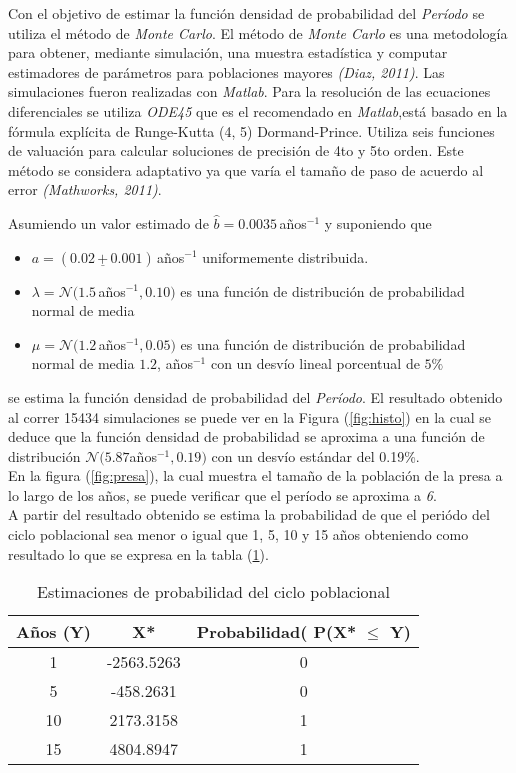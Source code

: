 \documentclass{SPANISH_acm_proc_article-sp}
\begin{document}
Con el objetivo de estimar la funci\'on densidad de probabilidad del \emph{Per\'iodo}
se utiliza el m\'etodo de \textit{Monte Carlo}. El m\'etodo de \textit{Monte Carlo} es una metodolog\'ia
para obtener, mediante simulaci\'on, una muestra estad\'istica y computar estimadores
de par\'ametros para poblaciones mayores \textit{(Diaz, 2011)}. Las simulaciones fueron
realizadas con \textit{Matlab}. Para la resoluci\'on de las ecuaciones diferenciales se
 utiliza \textit{ODE45} que es el recomendado en
\textit{Matlab},est\'a basado en la f\'ormula expl\'icita de Runge-Kutta (4, 5) Dormand-Prince. Utiliza seis
funciones de valuaci\'on para calcular soluciones de precisi\'on de 4to y 5to orden. Este m\'etodo se considera
adaptativo ya que var\'ia el tama\~no de paso de acuerdo al error \textit{(Mathworks, 2011)}.

Asumiendo un valor estimado de $ \hat b = 0.0035 \, $a\~nos$^{-1} $ y suponiendo que
\begin{itemize}
\item $ a = (0.02 \, \underline{+} \, 0.001) \, $a\~nos$^{-1}$ uniformemente distribuida.
\item $ \lambda = \mathcal{N}(1.5 \, $a\~nos$^{-1}, 0.10) $ es una funci\'on de distribuci\'on de probabilidad normal de media
\item  $ \mu = \mathcal{N}(1.2 \, $a\~nos$^{-1}, 0.05) $ es una funci\'on de distribuci\'on de probabilidad normal de media $ 1.2$, a\~nos$^{-1}$ con un desv\'io lineal porcentual de $5\%$ 
\end{itemize}
se estima la funci\'on densidad de probabilidad del \emph{Per\'iodo}. El resultado obtenido al correr
15434 simulaciones se puede ver en la Figura (\ref{fig:histo}) en la cual se deduce que la funci\'on densidad de probabilidad se aproxima a una funci\'on de distribuci\'on $\mathcal{N}(5.87$a\~nos$^{-1}, 0.19)$ con un desv\'io est\'andar del 0.19\%.\\

En la figura (\ref{fig:presa}), la cual muestra el tama\~no de la poblaci\'on de la presa a lo largo de los a\~nos, se puede verificar que el per\'iodo se aproxima a \textit{6}.
\\
A partir del resultado obtenido se estima la probabilidad de que el peri\'odo del ciclo
poblacional sea menor o igual que 1, 5, 10 y 15 a\~nos obteniendo como resultado lo que se expresa en la tabla (\ref{fig:tableCycle}).


\begin{table}
\begin{tabular}{|c|c|c|}
	\hline
	A\~nos (Y) 	& 		X*		&		Probabilidad( P(X* $\leq$ Y)		\\
	\hline \hline
	1				&	-2563.5263	&	0 \\
	\hline
	5				&		-458.2631 & 0 \\
	\hline
	10		&	2173.3158 & 1 \\
	\hline
	15		& 4804.8947 & 1 \\
	\hline
\end{tabular}
	\caption{Estimaciones de probabilidad del ciclo poblacional}
	\label{fig:tableCycle}
\end{table}
\end{document}
